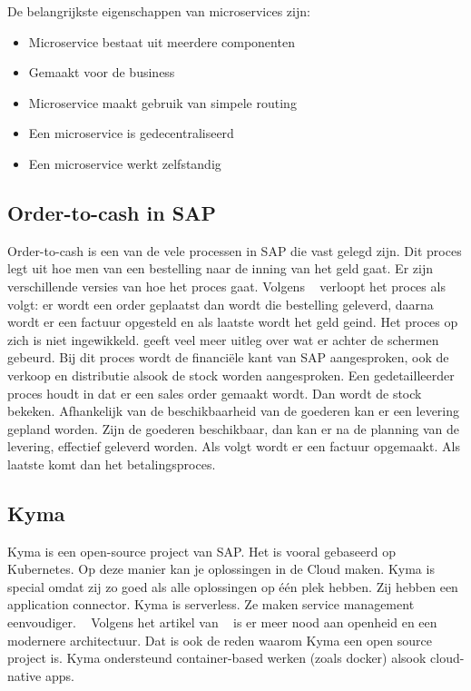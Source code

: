 De belangrijkste eigenschappen van microservices zijn:
\begin{itemize}
	\item Microservice bestaat uit meerdere componenten
	\item Gemaakt voor de business
	\item Microservice maakt gebruik van simpele routing
	\item Een microservice is gedecentraliseerd
	\item Een microservice werkt zelfstandig
\end{itemize}

\subsection{Order-to-cash in SAP}
Order-to-cash is een van de vele processen in SAP die vast gelegd zijn. Dit proces legt uit hoe men van een bestelling naar de inning van het geld gaat. Er zijn verschillende versies van hoe het proces gaat. Volgens ~\cite{Akthar2018} verloopt het proces als volgt: er wordt een order geplaatst dan wordt die bestelling geleverd, daarna wordt er een factuur opgesteld en als laatste wordt het geld geind. Het proces op zich is niet ingewikkeld. \~\cite{OpenSap2018} geeft veel meer uitleg over wat er achter de schermen gebeurd. Bij dit proces wordt de financiële kant van SAP aangesproken, ook de verkoop en distributie alsook de stock worden aangesproken. Een gedetailleerder proces houdt in dat er een sales order gemaakt wordt. Dan wordt de stock bekeken. Afhankelijk van de beschikbaarheid van de goederen kan er een levering gepland worden. Zijn de goederen beschikbaar, dan kan er na de planning van de levering, effectief geleverd worden. Als volgt wordt er een factuur opgemaakt. Als laatste komt dan het betalingsproces. 

\subsection{Kyma}
Kyma is een open-source project van SAP. Het is vooral gebaseerd op Kubernetes. Op deze manier kan je oplossingen in de Cloud maken. Kyma is special omdat zij zo goed als alle oplossingen op één plek hebben. Zij hebben een application connector. Kyma is serverless. Ze maken service management eenvoudiger. ~\cite{Kyma2019}
Volgens het artikel van ~\cite{Semerdzhiev2018} is er meer nood aan openheid en een modernere architectuur. Dat is ook de reden waarom Kyma een open source project is. Kyma ondersteund container-based werken (zoals docker) alsook cloud-native apps. 

